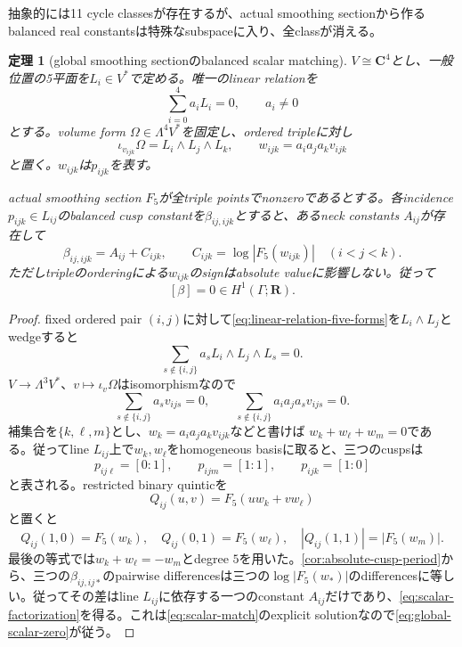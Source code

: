 \documentclass[11pt,a4paper]{ltjsarticle}
\newtheorem{theorem}{定理}[section]
\theoremstyle{definition}
\theoremstyle{remark}
\newcommand{\CC}{\mathbf C}
\newcommand{\RR}{\mathbf R}
\begin{document}
抽象的には11 cycle classesが存在するが、actual smoothing sectionから作るbalanced real constantsは特殊なsubspaceに入り、全classが消える。

\begin{theorem}[global smoothing sectionのbalanced scalar matching]\label{thm:global-scalar-matching}
$V\cong\CC^4$とし、一般位置の5平面を$L_i\in V^*$で定める。唯一のlinear relationを
\begin{equation}\label{eq:linear-relation-five-forms}
 \sum_{i=0}^4a_iL_i=0,
 \qquad a_i\ne0
\end{equation}
とする。volume form $\Omega\in\Lambda^4V^*$を固定し、ordered tripleに対し
\begin{equation}\label{eq:triple-vector}
 \iota_{v_{ijk}}\Omega=L_i\wedge L_j\wedge L_k,
 \qquad
 w_{ijk}=a_ia_ja_kv_{ijk}
\end{equation}
と置く。$w_{ijk}$は$p_{ijk}$を表す。

actual smoothing section $F_5$が全triple pointsでnonzeroであるとする。各incidence $p_{ijk}\in L_{ij}$のbalanced cusp constantを$\beta_{ij,ijk}$とすると、あるneck constants $A_{ij}$が存在して
\begin{equation}\label{eq:scalar-factorization}
 \boxed{
 \beta_{ij,ijk}=A_{ij}+C_{ijk},
 \qquad
 C_{ijk}=\log|F_5(w_{ijk})|\quad(i<j<k).
 }
\end{equation}
ただしtripleのorderingによる$w_{ijk}$のsignはabsolute valueに影響しない。従って
\begin{equation}\label{eq:global-scalar-zero}
 [\beta]=0\in H^1(\Gamma;\RR).
\end{equation}
\end{theorem}

\begin{proof}
fixed ordered pair $(i,j)$に対して\eqref{eq:linear-relation-five-forms}を$L_i\wedge L_j$とwedgeすると
\[
 \sum_{s\notin\{i,j\}}a_sL_i\wedge L_j\wedge L_s=0.
\]
$V\to\Lambda^3V^*$、$v\mapsto\iota_v\Omega$はisomorphismなので
\begin{equation}\label{eq:three-vector-relation}
 \sum_{s\notin\{i,j\}}a_s v_{ijs}=0,
 \qquad
 \sum_{s\notin\{i,j\}}a_ia_ja_s v_{ijs}=0.
\end{equation}
補集合を$\{k,\ell,m\}$とし、$w_k=a_ia_ja_kv_{ijk}$などと書けば
$w_k+w_\ell+w_m=0$である。従ってline $L_{ij}$上で$w_k,w_\ell$をhomogeneous basisに取ると、三つのcuspsは
\[
 p_{ij\ell}=[0:1],\qquad
 p_{ijm}=[1:1],\qquad
 p_{ijk}=[1:0]
\]
と表される。restricted binary quinticを
\[
 Q_{ij}(u,v)=F_5(uw_k+vw_\ell)
\]
と置くと
\[
 Q_{ij}(1,0)=F_5(w_k),\quad
 Q_{ij}(0,1)=F_5(w_\ell),\quad
 |Q_{ij}(1,1)|=|F_5(w_m)|.
\]
最後の等式では$w_k+w_\ell=-w_m$とdegree $5$を用いた。\cref{cor:absolute-cusp-period}から、三つの$\beta_{ij,ij*}$のpairwise differencesは三つの$\log|F_5(w_*)|$のdifferencesに等しい。従ってその差はline $L_{ij}$に依存する一つのconstant $A_{ij}$だけであり、\eqref{eq:scalar-factorization}を得る。これは\eqref{eq:scalar-match}のexplicit solutionなので\eqref{eq:global-scalar-zero}が従う。
\end{proof}
\end{document}
